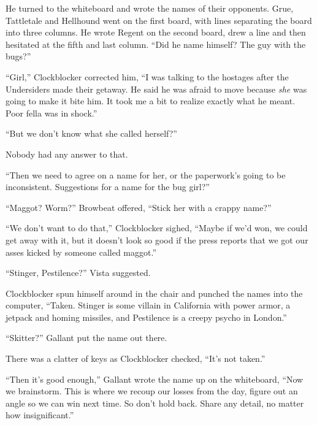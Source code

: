 He turned to the whiteboard and wrote the names of their opponents.  Grue, Tattletale and Hellhound went on the first board, with lines separating the board into three columns.  He wrote Regent on the second board, drew a line and then hesitated at the fifth and last column.  ``Did he name himself?  The guy with the bugs?''



``Girl,'' Clockblocker corrected him, ``I was talking to the hostages after the Undersiders made their getaway.  He said he was afraid to move because \emph{she} was going to make it bite him.  It took me a bit to realize exactly what he meant.  Poor fella was in shock.''



``But we don't know what she called herself?''



Nobody had any answer to that.



``Then we need to agree on a name for her, or the paperwork's going to be inconsistent.  Suggestions for a name for the bug girl?''



``Maggot?  Worm?'' Browbeat offered, ``Stick her with a crappy name?''



``We don't want to do that,'' Clockblocker sighed, ``Maybe if we'd won, we could get away with it, but it doesn't look so good if the press reports that we got our asses kicked by someone called maggot.''



``Stinger, Pestilence?'' Vista suggested.



Clockblocker spun himself around in the chair and punched the names into the computer, ``Taken.  Stinger is some villain in California with power armor, a jetpack and homing missiles, and Pestilence is a creepy psycho in London.''



``Skitter?'' Gallant put the name out there.



There was a clatter of keys as Clockblocker checked, ``It's not taken.''



``Then it's good enough,'' Gallant wrote the name up on the whiteboard, ``Now we brainstorm.  This is where we recoup our losses from the day, figure out an angle so we can win next time.  So don't hold back.  Share any detail, no matter how insignificant.''




